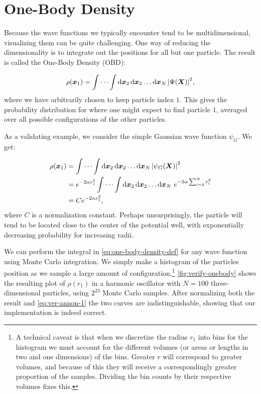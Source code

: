 \documentclass[Thesis.tex]{subfiles}
\begin{document}
\section{One-Body Density}

Because the wave functions we typically encounter tend to be multidimensional,
visualizing them can be quite challenging. One way of reducing the
dimensionality is to integrate out the positions for all but one particle. The
result is called the One-Body Density (OBD):

\begin{align}
  \label{eq:one-body-density-def}
  \rho(\bm{x}_1) = \idotsint \dd{\bm{x}_2}\dd{\bm{x}_2}\dots\dd{\bm{x}_N} \abs{\Psi(\bm{X})}^2,
\end{align}
where we have arbitrarily chosen to keep particle index $1$. This gives the
probability distribution for where one might expect to find particle $1$,
averaged over all possible configurations of the other particles.

As a validating example, we consider the simple Gaussian wave function $\psi_G$.
We get:

\begin{align}
  \rho(\bm{x}_1) &= \idotsint \dd{\bm{x}_2}\dd{\bm{x}_2}\dots\dd{\bm{x}_N} \abs{\psi_G(\bm{X})}^2\\
  &= e^{-2\alpha r_1^2}\idotsint \dd{\bm{x}_2}\dd{\bm{x}_2}\dots\dd{\bm{x}_N} \,e^{-2\alpha\sum_{i=2}^N r_i^2}\\
    &= C e^{-2\alpha r_1^2},\label{eq:ver-annon-1}
\end{align}
where $C$ is a normalization constant. Perhaps unsurprisingly, the particle will
tend to be located close to the center of the potential well, with exponentially
decreasing probability for increasing radii.

We can perform the integral in \cref{eq:one-body-density-def} for any wave
function using Monte Carlo integration. We simply make a histogram of the
particles position as we sample a large amount of configuration.\footnote{A
technical caveat is that when we discretize the radius $r_1$ into bins for the
histogram we must account for the different volumes (or areas or lengths in two
and one dimensions) of the bins. Greater $r$ will correspond to greater volumes,
and because of this they will receive a correspondingly greater proportion of
the samples. Dividing the bin counts by their respective volumes fixes this.}
\cref{fig:verify-onebody} shows the resulting plot of $\rho(r_1)$ in a harmonic
oscillator with $N=100$ three-dimensional particles, using $2^{23}$ Monte Carlo
samples. After normalizing both the result and \cref{eq:ver-annon-1} the two
curves are indistinguishable, showing that our implementation is indeed correct.
\end{document}
